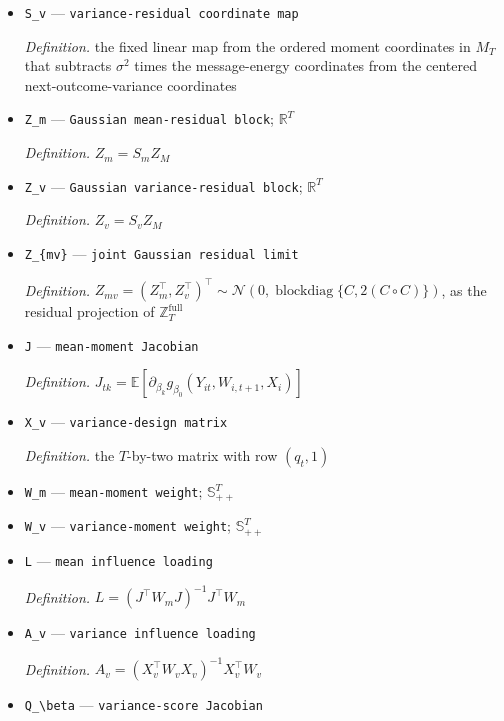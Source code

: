 \documentclass{article}
\begin{document}
\begin{itemize}
  \item \texttt{S\_\allowbreak{}v} --- \texttt{variance-\allowbreak{}residual coordinate map}
  \par\smallskip\noindent\emph{Definition.} the fixed linear map from the ordered moment coordinates in \(M_T\) that subtracts \(\sigma^2\) times the message-energy coordinates from the centered next-outcome-variance coordinates
  \item \texttt{Z\_\allowbreak{}m} --- \texttt{Gaussian mean-\allowbreak{}residual block}; \(\mathbb R^T\)
  \par\smallskip\noindent\emph{Definition.} \(Z_m=S_mZ_M\)
  \item \texttt{Z\_\allowbreak{}v} --- \texttt{Gaussian variance-\allowbreak{}residual block}; \(\mathbb R^T\)
  \par\smallskip\noindent\emph{Definition.} \(Z_v=S_vZ_M\)
  \item \texttt{Z\_\allowbreak{}\{mv\}\allowbreak{}} --- \texttt{joint Gaussian residual limit}
  \par\smallskip\noindent\emph{Definition.} \(Z_{mv}=(Z_m^{\top},Z_v^{\top})^{\top}\sim\mathcal N(0,\operatorname{blockdiag}\{C,2(C\circ C)\})\), as the residual projection of \(\mathbb Z_T^{\mathrm{full}}\)
  \item \texttt{J} --- \texttt{mean-\allowbreak{}moment Jacobian}
  \par\smallskip\noindent\emph{Definition.} \(J_{tk}=\mathbb E[\partial_{\beta_k}g_{\beta_0}(Y_{it},W_{i,t+1},X_i)]\)
  \item \texttt{X\_\allowbreak{}v} --- \texttt{variance-\allowbreak{}design matrix}
  \par\smallskip\noindent\emph{Definition.} the \(T\)-by-two matrix with row \((q_t,1)\)
  \item \texttt{W\_\allowbreak{}m} --- \texttt{mean-\allowbreak{}moment weight}; \(\mathbb S_{++}^T\)
  \item \texttt{W\_\allowbreak{}v} --- \texttt{variance-\allowbreak{}moment weight}; \(\mathbb S_{++}^T\)
  \item \texttt{L} --- \texttt{mean influence loading}
  \par\smallskip\noindent\emph{Definition.} \(L=(J^{\top}W_mJ)^{-1}J^{\top}W_m\)
  \item \texttt{A\_\allowbreak{}v} --- \texttt{variance influence loading}
  \par\smallskip\noindent\emph{Definition.} \(A_v=(X_v^{\top}W_vX_v)^{-1}X_v^{\top}W_v\)
  \item \texttt{Q\_\allowbreak{}\textbackslash{}\allowbreak{}beta} --- \texttt{variance-\allowbreak{}score Jacobian}

\end{itemize}
\end{document}
